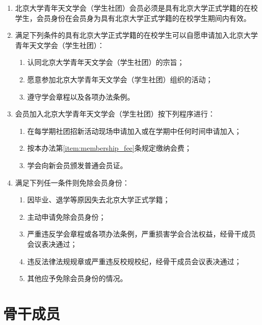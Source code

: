 \begin{enumerate}[resume]
    \item 北京大学青年天文学会（学生社团）会员必须是具有北京大学正式学籍的在校学生，会员身份在会员身为具有北京大学正式学籍的在校学生期间内有效。
    
    \item 满足下列条件的具有北京大学正式学籍的在校学生可以自愿申请加入北京大学青年天文学会（学生社团）：
    \begin{enumerate}
        \item 认同北京大学青年天文学会（学生社团）的宗旨；
        \item 愿意参加北京大学青年天文学会（学生社团）组织的活动；
        \item 遵守学会章程以及各项办法条例。
    \end{enumerate}
    
    \item 会员加入北京大学青年天文学会（学生社团）按下列程序进行：
    \begin{enumerate}
        \item 在每学期社团招新活动现场申请加入或在学期中任何时间申请加入；
        \item 按本办法第\ref{item:membership_fee}条规定缴纳会费；
        \item 学会向新会员颁发普通会员证。
    \end{enumerate}

    \item 满足下列任一条件则免除会员身份：
    \begin{enumerate}
        \item 因毕业、退学等原因失去北京大学正式学籍；
        \item 主动申请免除会员身份；
        \item 严重违反学会章程或各项办法条例，严重损害学会合法权益，经骨干成员会议表决通过；
        \item 违反法律法规规章或严重违反校规校纪，经骨干成员会议表决通过；
        \item 其他应予免除会员身份的情况。
    \end{enumerate}
\end{enumerate}

\section{骨干成员}


